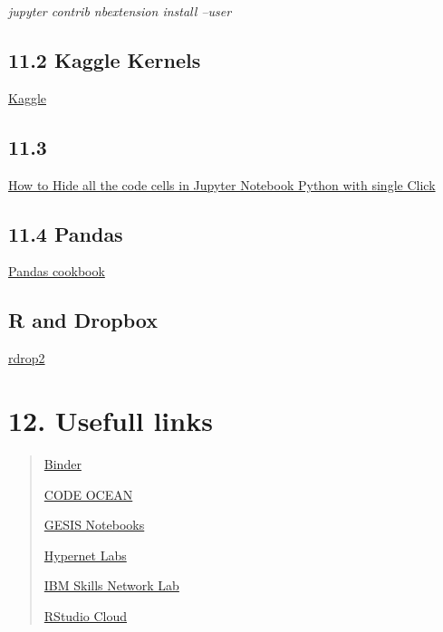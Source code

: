 \documentclass[
  12pt,
]{article}
\begin{document}
\emph{jupyter contrib nbextension install --user}

\hypertarget{kaggle-kernels}{%
\subsection{11.2 Kaggle Kernels}\label{kaggle-kernels}}

\href{https://towardsdatascience.com/introduction-to-kaggle-kernels-2ad754ebf77}{Kaggle}

\hypertarget{section}{%
\subsection{11.3}\label{section}}

\href{https://www.youtube.com/watch?v=rJsWJMBksK0}{How to Hide all the
code cells in Jupyter Notebook Python with single Click}

\hypertarget{pandas}{%
\subsection{11.4 Pandas}\label{pandas}}

\href{https://mybinder.org/v2/gh/jvns/pandas-cookbook/master}{Pandas
cookbook}

\hypertarget{r-and-dropbox}{%
\subsection{R and Dropbox}\label{r-and-dropbox}}

\href{https://github.com/karthik/rdrop2}{rdrop2}

\hypertarget{usefull-links}{%
\section{12. Usefull links}\label{usefull-links}}

\begin{quote}
\href{https://mybinder.org/}{Binder}

\href{https://codeocean.com/}{CODE OCEAN}

\href{https://notebooks.gesis.org/hub/home}{GESIS Notebooks}

\href{https://codeocean.com/}{Hypernet Labs}

\href{https://labs.cognitiveclass.ai/}{IBM Skills Network Lab}

\href{https://rstudio.cloud/}{RStudio Cloud}
\end{quote}
\end{document}
